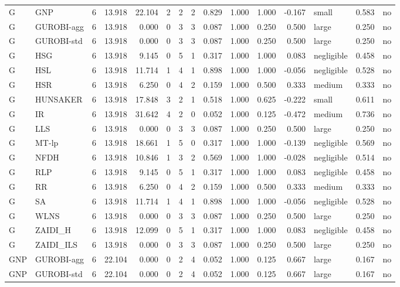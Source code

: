 \begin{table}[htbp]
\begin{tabular}{llrrrrrrrrrrlrr}
G & GNP & 6 & 13.918 & 22.104 & 2 & 2 & 2 & 0.829 & 1.000 & 1.000 & -0.167 & small & 0.583 & no \\
G & GUROBI-agg & 6 & 13.918 & 0.000 & 0 & 3 & 3 & 0.087 & 1.000 & 0.250 & 0.500 & large & 0.250 & no \\
G & GUROBI-std & 6 & 13.918 & 0.000 & 0 & 3 & 3 & 0.087 & 1.000 & 0.250 & 0.500 & large & 0.250 & no \\
G & HSG & 6 & 13.918 & 9.145 & 0 & 5 & 1 & 0.317 & 1.000 & 1.000 & 0.083 & negligible & 0.458 & no \\
G & HSL & 6 & 13.918 & 11.714 & 1 & 4 & 1 & 0.898 & 1.000 & 1.000 & -0.056 & negligible & 0.528 & no \\
G & HSR & 6 & 13.918 & 6.250 & 0 & 4 & 2 & 0.159 & 1.000 & 0.500 & 0.333 & medium & 0.333 & no \\
G & HUNSAKER & 6 & 13.918 & 17.848 & 3 & 2 & 1 & 0.518 & 1.000 & 0.625 & -0.222 & small & 0.611 & no \\
G & IR & 6 & 13.918 & 31.642 & 4 & 2 & 0 & 0.052 & 1.000 & 0.125 & -0.472 & medium & 0.736 & no \\
G & LLS & 6 & 13.918 & 0.000 & 0 & 3 & 3 & 0.087 & 1.000 & 0.250 & 0.500 & large & 0.250 & no \\
G & MT-lp & 6 & 13.918 & 18.661 & 1 & 5 & 0 & 0.317 & 1.000 & 1.000 & -0.139 & negligible & 0.569 & no \\
G & NFDH & 6 & 13.918 & 10.846 & 1 & 3 & 2 & 0.569 & 1.000 & 1.000 & -0.028 & negligible & 0.514 & no \\
G & RLP & 6 & 13.918 & 9.145 & 0 & 5 & 1 & 0.317 & 1.000 & 1.000 & 0.083 & negligible & 0.458 & no \\
G & RR & 6 & 13.918 & 6.250 & 0 & 4 & 2 & 0.159 & 1.000 & 0.500 & 0.333 & medium & 0.333 & no \\
G & SA & 6 & 13.918 & 11.714 & 1 & 4 & 1 & 0.898 & 1.000 & 1.000 & -0.056 & negligible & 0.528 & no \\
G & WLNS & 6 & 13.918 & 0.000 & 0 & 3 & 3 & 0.087 & 1.000 & 0.250 & 0.500 & large & 0.250 & no \\
G & ZAIDI\_H & 6 & 13.918 & 12.099 & 0 & 5 & 1 & 0.317 & 1.000 & 1.000 & 0.083 & negligible & 0.458 & no \\
G & ZAIDI\_ILS & 6 & 13.918 & 0.000 & 0 & 3 & 3 & 0.087 & 1.000 & 0.250 & 0.500 & large & 0.250 & no \\
GNP & GUROBI-agg & 6 & 22.104 & 0.000 & 0 & 2 & 4 & 0.052 & 1.000 & 0.125 & 0.667 & large & 0.167 & no \\
GNP & GUROBI-std & 6 & 22.104 & 0.000 & 0 & 2 & 4 & 0.052 & 1.000 & 0.125 & 0.667 & large & 0.167 & no \\

\end{tabular}
\end{table}
